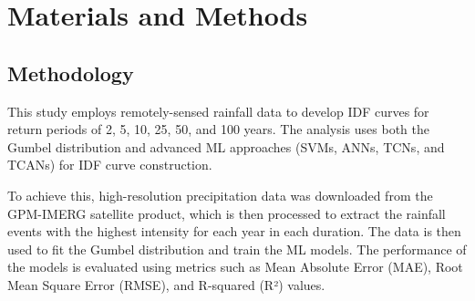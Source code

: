 \section{Materials and Methods}
\subsection{Methodology}
This study employs remotely-sensed rainfall data to develop IDF curves for return periods of 2, 5, 10, 25, 50, and 100 years. The analysis uses both the Gumbel distribution and advanced ML approaches (SVMs, ANNs, TCNs, and TCANs) for IDF curve construction.

\vspace{1em}

To achieve this, high-resolution precipitation data was downloaded from the GPM-IMERG satellite product, which is then processed to extract the rainfall events with the highest intensity for each year in each duration. The data is then used to fit the Gumbel distribution and train the ML models. The performance of the models is evaluated using metrics such as Mean Absolute Error (MAE), Root Mean Square Error (RMSE), and R-squared (R²) values.





